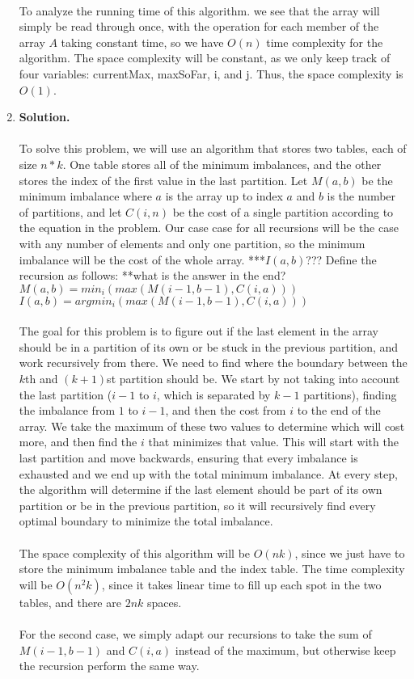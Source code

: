 \documentclass[11pt]{article}
\newcommand\solution{%
  \textbf{Solution.}\\%
}
\begin{document}
\begin{enumerate}
\\
To analyze the running time of this algorithm. we see that the array will simply be read through once, with the operation for each member of the array $A$ taking constant time, so we have $O(n)$ time complexity for the algorithm. The space complexity will be constant, as we only keep track of four variables: currentMax, maxSoFar, i, and j. Thus, the space complexity is $O(1)$. 


\item

\solution \\
To solve this problem, we will use an algorithm that stores two tables, each of size $n*k$. One table stores all of the minimum imbalances, and the other stores the index of the first value in the last partition. Let $M(a,b)$ be the minimum imbalance where $a$ is the array up to index $a$ and $b$ is the number of partitions, and let $C(i,n)$ be the cost of a single partition according to the equation in the problem. Our case case for all recursions will be the case with any number of elements and only one partition, so the minimum imbalance will be the cost of the whole array. ***$I(a,b)$??? Define the recursion as follows: **what is the answer in the end? \\
$M(a,b) = min_i(max(M(i-1,b-1),C(i,a)))$ \\
$I(a,b) = argmin_i(max(M(i-1,b-1),C(i,a)))$ \\
\\
The goal for this problem is to figure out if the last element in the array should be in a partition of its own or be stuck in the previous partition, and work recursively from there. We need to find where the boundary between the $k$th and $(k+1)$st partition should be. We start by not taking into account the last partition ($i-1$ to $i$, which is separated by $k-1$ partitions), finding the imbalance from $1$ to $i-1$, and then the cost from $i$ to the end of the array. We take the maximum of these two values to determine which will cost more, and then find the $i$ that minimizes that value. This will start with the last partition and move backwards, ensuring that every imbalance is exhausted and we end up with the total minimum imbalance. At every step, the algorithm will determine if the last element should be part of its own partition or be in the previous partition, so it will recursively find every optimal boundary to minimize the total imbalance. \\
\\
The space complexity of this algorithm will be $O(nk)$, since we just have to store the minimum imbalance table and the index table. The time complexity will be $O(n^2k)$, since it takes linear time to fill up each spot in the two tables, and there are $2nk$ spaces. \\
\\
For the second case, we simply adapt our recursions to take the sum of $M(i-1,b-1)$ and $C(i,a)$ instead of the maximum, but otherwise keep the recursion perform the same way.



\end{enumerate}
\end{document}
